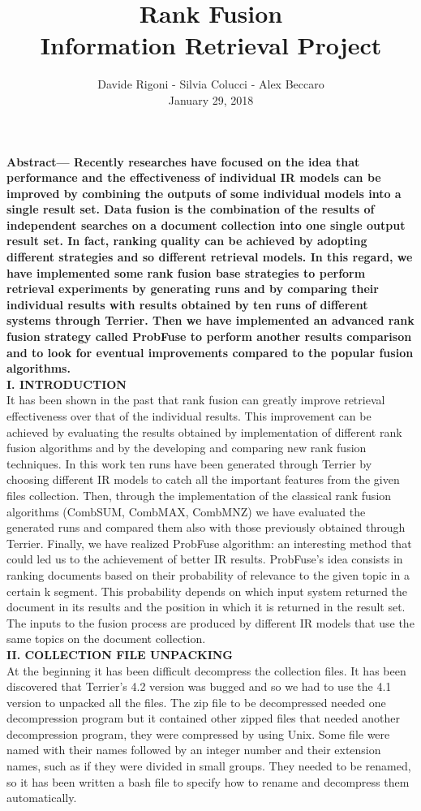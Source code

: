 \documentclass[12pt,journal]{IEEEtran}
\title{Rank Fusion \\ {\huge Information Retrieval Project}}
\author{Davide Rigoni - Silvia Colucci - Alex Beccaro \\ January 29, 2018}
\begin{document}
	\maketitle
	\textbf {Abstract— Recently researches have focused on the idea that performance and the effectiveness of individual IR models can be improved by combining the outputs of some individual models into a single result set. Data fusion is the combination of the results of independent searches on a document collection into one single output result set. In fact, ranking quality can be achieved by adopting different strategies and so different retrieval models.
In this regard, we have implemented some rank fusion base strategies to perform retrieval experiments by generating runs and by comparing their individual results with results obtained by ten runs of different systems through Terrier.
Then we have implemented an advanced rank fusion strategy called ProbFuse to perform another results comparison and to look for eventual improvements compared to the popular fusion algorithms.} \\

\textbf{I. INTRODUCTION} \\
It has been shown in the past that rank fusion can greatly improve retrieval effectiveness over that of the individual results.
This improvement can be achieved by evaluating the results obtained by implementation of different rank fusion algorithms and by the developing and comparing new rank fusion techniques.
In this work ten runs have been generated through Terrier by choosing different IR models to catch all the important features from the given files collection. Then, through the implementation of the classical rank fusion algorithms (CombSUM, CombMAX, CombMNZ) we have evaluated the generated runs and compared them also with those previously obtained through Terrier. 
Finally, we have realized ProbFuse algorithm: an interesting method that could led us to the achievement of better IR results.
ProbFuse’s idea consists in ranking documents based on their probability of relevance to the given topic in a certain k segment. This probability depends on which input system returned the document in its results and the position in which it is returned in the result set. 
The inputs to the fusion process are produced by different IR models that use the same topics on the document collection.\\

\textbf{II.	COLLECTION FILE UNPACKING} \\
At the beginning it has been difficult decompress the collection files. It has been discovered that Terrier’s 4.2 version was bugged and so we had to use the 4.1 version to unpacked all the files.
The zip file to be decompressed needed one decompression program but it contained other zipped files that needed another decompression program, they were compressed by using Unix. Some file were named with their names followed by an integer number and their extension names, such as if they were divided in small groups. They needed to be renamed, so it has been written a bash file to specify how to rename and decompress them automatically. \\
\end{document}
